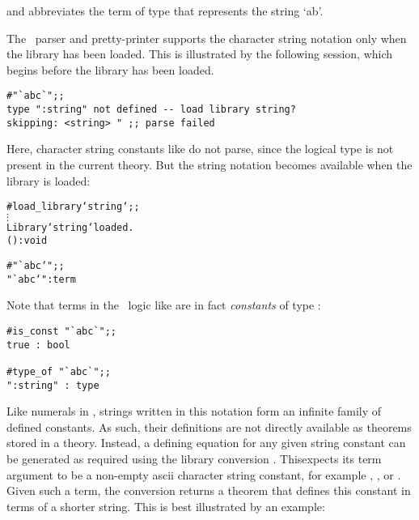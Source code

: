 \noindent and abbreviates the term of type  that represents the
string `ab'.

The \HOL\ parser and pretty-printer supports the character string notation only
when the  library has been loaded. This is illustrated by the
following session, which begins before the library has been loaded.

\setcounter{sessioncount}{1}
\begin{session}\begin{verbatim}
#"`abc`";;
type ":string" not defined -- load library string?
skipping: <string> " ;; parse failed
\end{verbatim}\end{session}

\noindent Here, character string constants like  do not parse,
since the logical type  is not present in the current theory. But 
the string notation becomes available when the library is loaded:

\begin{session}\begin{alltt}
#load_library `string`;;
  \(\vdots\)
Library `string` loaded.
() : void

#"`abc`";;
"`abc`" : term
\end{alltt}\end{session}

\noindent Note that terms in the \HOL\ logic like  are in fact {\it
constants\/} of type :

\begin{session}\begin{verbatim}
#is_const "`abc`";;
true : bool

#type_of "`abc`";;
":string" : type
\end{verbatim}\end{session}

Like numerals in \HOL, strings
written in this notation form an infinite family of defined constants.  As
such, their definitions are not directly available as theorems stored in a
theory.  Instead, a defining equation for any given string constant can be
generated as required using the  library conversion
. This\pagebreak[3] expects its term argument to be a
non-empty ascii character string constant, for example , ,
or .  Given such a term, the conversion returns a theorem that
defines this constant in terms of a shorter string.  This is best illustrated
by an example:

